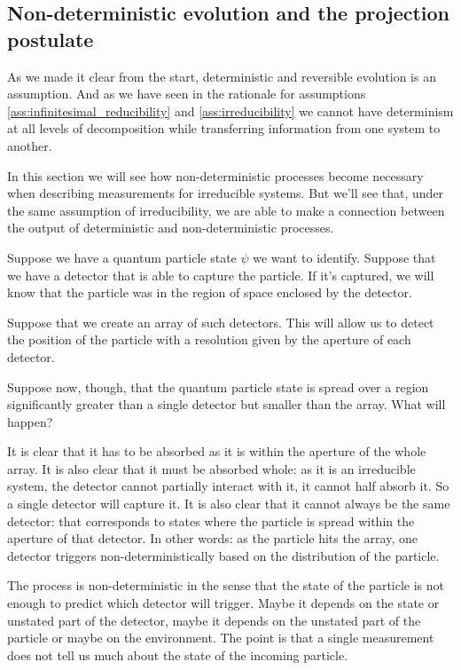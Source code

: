 \documentclass[smallextended]{svjour3}
\numberwithin{equation}{section}
\begin{document}
\subsection{Non-deterministic evolution and the projection postulate}

As we made it clear from the start, deterministic and reversible evolution is an assumption. And as we have seen in the rationale for assumptions \ref{ass:infinitesimal_reducibility} and \ref{ass:irreducibility} we cannot have determinism at all levels of decomposition while transferring information from one system to another.

In this section we will see how non-deterministic processes become necessary when describing measurements for irreducible systems. But we'll see that, under the same assumption of irreducibility, we are able to make a connection between the output of deterministic and non-deterministic processes.

Suppose we have a quantum particle state $\psi$ we want to identify. Suppose that we have a detector that is able to capture the particle. If it's captured, we will know that the particle was in the region of space enclosed by the detector.

Suppose that we create an array of such detectors. This will allow us to detect the position of the particle with a resolution given by the aperture of each detector.

Suppose now, though, that the quantum particle state is spread over a region significantly greater than a single detector but smaller than the array. What will happen?

It is clear that it has to be absorbed as it is within the aperture of the whole array. It is also clear that it must be absorbed whole: as it is an irreducible system, the detector cannot partially interact with it, it cannot half absorb it. So a single detector will capture it. It is also clear that it cannot always be the same detector: that corresponds to states where the particle is spread within the aperture of that detector. In other words: as the particle hits the array, one detector triggers non-deterministically based on the distribution of the particle.

The process is non-deterministic in the sense that the state of the particle is not enough to predict which detector will trigger. Maybe it depends on the state or unstated part of the detector, maybe it depends on the unstated part of the particle or maybe on the environment. The point is that a single measurement does not tell us much about the state of the incoming particle.
\end{document}
